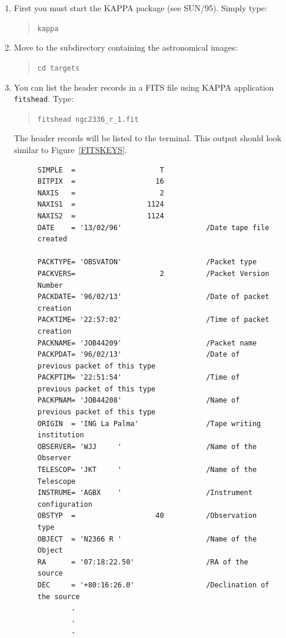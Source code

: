 \documentclass[twoside,11pt]{article}
\newcommand{\xref}[3]{#1}
\begin{document}
\begin{enumerate}

  \item First you must start the KAPPA package (see
   \xref{SUN/95}{sun95}{}\/\cite{SUN95}).  Simply type:

  \begin{quote}
   {\tt kappa}
  \end{quote}

  \item Move to the subdirectory containing the astronomical images:

  \begin{quote}
   {\tt cd targets}
  \end{quote}

  \item You can list the header records in a FITS file using KAPPA
   application \xref{{\tt fitshead}}{sun95}{FITSHEAD}.  Type:

  \begin{quote}
   {\tt fitshead ngc2336\_r\_1.fit}
  \end{quote}

   The header records will be listed to the terminal.  This output should
   look similar to Figure~\ref{FITSKEYS}.

  \begin{figure}[htbp]

\begin{verbatim}
SIMPLE  =                    T    
BITPIX  =                   16    
NAXIS   =                    2    
NAXIS1  =                 1124    
NAXIS2  =                 1124    
DATE    = '13/02/96'                    /Date tape file created    
    
PACKTYPE= 'OBSVATON'                    /Packet type    
PACKVERS=                    2          /Packet Version Number    
PACKDATE= '96/02/13'                    /Date of packet creation    
PACKTIME= '22:57:02'                    /Time of packet creation    
PACKNAME= 'JOB44209'                    /Packet name    
PACKPDAT= '96/02/13'                    /Date of previous packet of this type   
PACKPTIM= '22:51:54'                    /Time of previous packet of this type   
PACKPNAM= 'JOB44208'                    /Name of previous packet of this type   
ORIGIN  = 'ING La Palma'                /Tape writing institution    
OBSERVER= 'WJJ     '                    /Name of the Observer    
TELESCOP= 'JKT     '                    /Name of the Telescope    
INSTRUME= 'AGBX    '                    /Instrument configuration    
OBSTYP  =                   40          /Observation type    
OBJECT  = 'N2366 R '                    /Name of the Object    
RA      = '07:18:22.50'                 /RA of the source    
DEC     = '+80:16:26.0'                 /Declination of the source   
        .
        .
        .
\end{verbatim}


\end{figure}
\end{enumerate}
\end{document}
